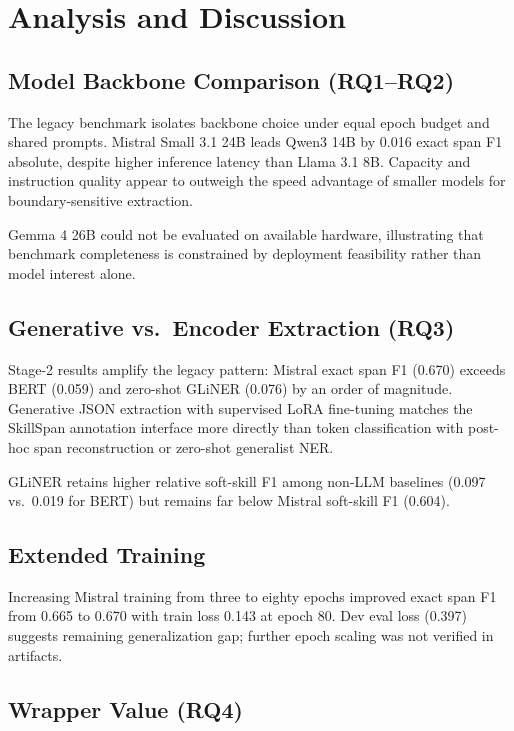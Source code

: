 \chapter{Analysis and Discussion}
\label{ch:discussion}

\section{Model Backbone Comparison (RQ1--RQ2)}

The legacy benchmark isolates backbone choice under equal epoch budget and shared prompts.
Mistral Small 3.1 24B leads Qwen3 14B by 0.016 exact span F1 absolute, despite higher inference latency than Llama 3.1 8B.
Capacity and instruction quality appear to outweigh the speed advantage of smaller models for boundary-sensitive extraction.

Gemma 4 26B could not be evaluated on available hardware, illustrating that benchmark completeness is constrained by deployment feasibility rather than model interest alone.

\section{Generative vs.\ Encoder Extraction (RQ3)}

Stage-2 results amplify the legacy pattern: Mistral exact span F1 (0.670) exceeds BERT (0.059) and zero-shot GLiNER (0.076) by an order of magnitude.
Generative JSON extraction with supervised LoRA fine-tuning matches the SkillSpan annotation interface more directly than token classification with post-hoc span reconstruction or zero-shot generalist NER.

GLiNER retains higher relative soft-skill F1 among non-LLM baselines (0.097 vs.\ 0.019 for BERT) but remains far below Mistral soft-skill F1 (0.604).

\section{Extended Training}

Increasing Mistral training from three to eighty epochs improved exact span F1 from 0.665 to 0.670 with train loss 0.143 at epoch 80.
Dev eval loss (0.397) suggests remaining generalization gap; further epoch scaling was not verified in artifacts.

\section{Wrapper Value (RQ4)}

